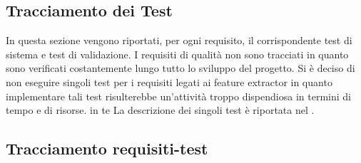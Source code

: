 \subsection{Tracciamento dei Test}
    \label{tracciamentotest}
    
In questa sezione vengono riportati, per ogni requisito, il corrispondente test di sistema
e test di validazione. I requisiti di qualità non sono tracciati in quanto sono verificati
costantemente lungo tutto lo sviluppo del progetto.
Si è deciso di non eseguire singoli test per i requisiti legati ai feature extractor\glossario{} in quanto implementare tali test risulterebbe un'attività troppo dispendiosa in termini di tempo e di risorse. in te
La descrizione dei singoli test è riportata nel \PdQ{} .

\subsection{Tracciamento requisiti-test}
\label{tracciamento}    
    
    
    \newdimen\larghezza
\setlength{\larghezza}{7cm}
\newdimen\dimTipo
\setlength{\dimTipo}{2cm}
\newdimen\dimFonti
\setlength{\dimFonti}{2cm}
	
